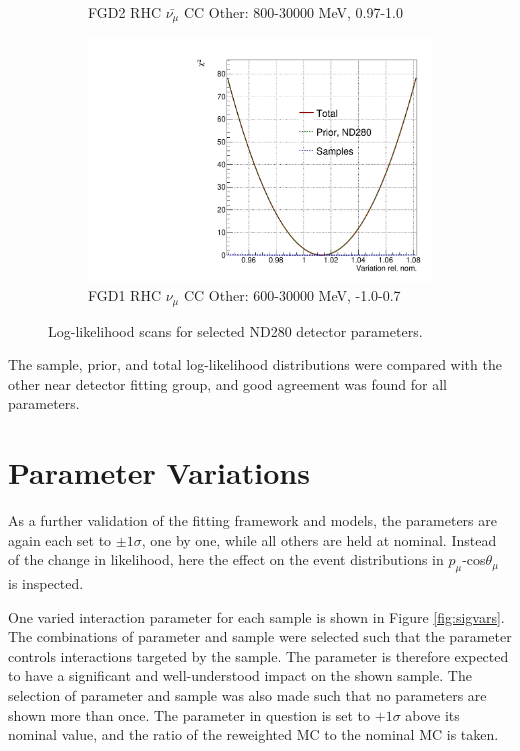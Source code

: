\begin{figure}[!htbp]
\begin{subfigure}{.49\textwidth}
  \caption{FGD2 RHC $\bar{\nu_{\mu}}$ CC Other: 800-30000 MeV, 0.97-1.0}
\end{subfigure}
\begin{subfigure}{.49\textwidth}
  \centering
  \includegraphics[width=0.7\linewidth]{figs/llh/ndd_556_llh.pdf}
  \caption{FGD1 RHC $\nu_{\mu}$ CC Other: 600-30000 MeV, -1.0-0.7}
\end{subfigure}
\caption{Log-likelihood scans for selected ND280 detector parameters.}
\label{fig:llhdet}
\end{figure}

The sample, prior, and total log-likelihood distributions were compared with the other near detector fitting group, and good agreement was found for all parameters.

\section{Parameter Variations}\label{sec:sigvar}

As a further validation of the fitting framework and models, the parameters are again each set to $\pm1\sigma$, one by one, while all others are held at nominal. Instead of the change in likelihood, here the effect on the event distributions in $p_{\mu}$-cos$\theta_{\mu}$ is inspected. 

One varied interaction parameter for each sample is shown in Figure \ref{fig:sigvars}. The combinations of parameter and sample were selected such that the parameter controls interactions targeted by the sample. The parameter is therefore expected to have a significant and well-understood impact on the shown sample. The selection of parameter and sample was also made such that no parameters are shown more than once. The parameter in question is set to $+1\sigma$ above its nominal value, and the ratio of the reweighted MC to the nominal MC is taken.


